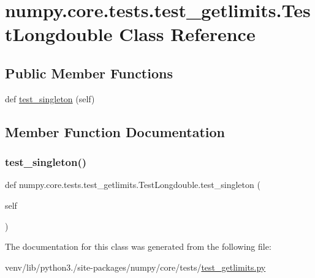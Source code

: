 \hypertarget{classnumpy_1_1core_1_1tests_1_1test__getlimits_1_1TestLongdouble}{}\section{numpy.\+core.\+tests.\+test\+\_\+getlimits.\+Test\+Longdouble Class Reference}
\label{classnumpy_1_1core_1_1tests_1_1test__getlimits_1_1TestLongdouble}
\subsection*{Public Member Functions}
\begin{DoxyCompactItemize}
\item 
def \hyperlink{classnumpy_1_1core_1_1tests_1_1test__getlimits_1_1TestLongdouble_af9d6b82e778b4689fcdd9efc40d91f8a}{test\+\_\+singleton} (self)
\end{DoxyCompactItemize}


\subsection{Member Function Documentation}
\mbox{\label{classnumpy_1_1core_1_1tests_1_1test__getlimits_1_1TestLongdouble_af9d6b82e778b4689fcdd9efc40d91f8a}} 
\subsubsection{\texorpdfstring{test\+\_\+singleton()}{test\_singleton()}}
{\footnotesize\ttfamily def numpy.\+core.\+tests.\+test\+\_\+getlimits.\+Test\+Longdouble.\+test\+\_\+singleton (\begin{DoxyParamCaption}\item[{}]{self }\end{DoxyParamCaption})}



The documentation for this class was generated from the following file\+:\begin{DoxyCompactItemize}
\item 
venv/lib/python3./site-\/packages/numpy/core/tests/\hyperlink{test__getlimits_8py}{test\+\_\+getlimits.\+py}\end{DoxyCompactItemize}

